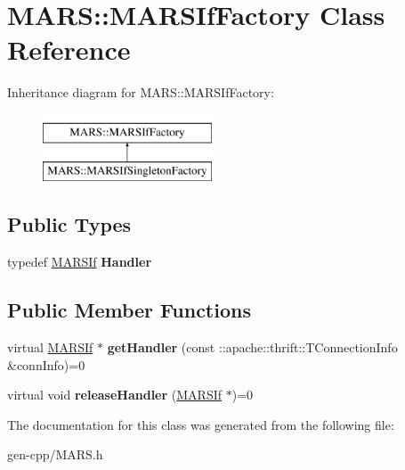 \hypertarget{classMARS_1_1MARSIfFactory}{}\section{M\+A\+RS\+:\+:M\+A\+R\+S\+If\+Factory Class Reference}
\label{classMARS_1_1MARSIfFactory}
Inheritance diagram for M\+A\+RS\+:\+:M\+A\+R\+S\+If\+Factory\+:\begin{figure}[H]
\begin{center}
\leavevmode
\includegraphics[height=2.000000cm]{classMARS_1_1MARSIfFactory}
\end{center}
\end{figure}
\subsection*{Public Types}
\begin{DoxyCompactItemize}
\item 
\mbox{\label{classMARS_1_1MARSIfFactory_aa263d8e893e274c43576ad71255ead2a}} 
typedef \hyperlink{classMARS_1_1MARSIf}{M\+A\+R\+S\+If} {\bfseries Handler}
\end{DoxyCompactItemize}
\subsection*{Public Member Functions}
\begin{DoxyCompactItemize}
\item 
\mbox{\label{classMARS_1_1MARSIfFactory_a6e93aa23111ebd1156e2f3900b3105da}} 
virtual \hyperlink{classMARS_1_1MARSIf}{M\+A\+R\+S\+If} $\ast$ {\bfseries get\+Handler} (const \+::apache\+::thrift\+::\+T\+Connection\+Info \&conn\+Info)=0
\item 
\mbox{\label{classMARS_1_1MARSIfFactory_a4e6ba812f3ec56383d55ff469b95da1e}} 
virtual void {\bfseries release\+Handler} (\hyperlink{classMARS_1_1MARSIf}{M\+A\+R\+S\+If} $\ast$)=0
\end{DoxyCompactItemize}


The documentation for this class was generated from the following file\+:\begin{DoxyCompactItemize}
\item 
gen-\/cpp/M\+A\+R\+S.\+h\end{DoxyCompactItemize}
